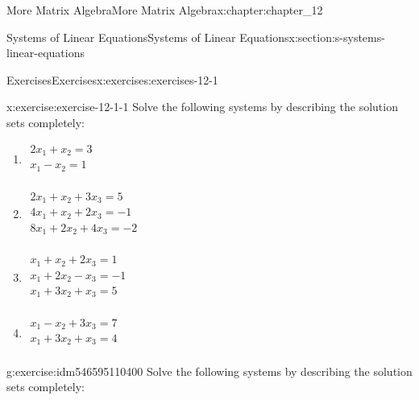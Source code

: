 \documentclass[oneside,10pt,]{book}
\numberwithin{equation}{section}
\begin{document}
\begin{chapterptx}{More Matrix Algebra}{}{More Matrix Algebra}{}{}{x:chapter:chapter_12}
\begin{sectionptx}{Systems of Linear Equations}{}{Systems of Linear Equations}{}{}{x:section:s-systems-linear-equations}
%
\begin{exercises-subsection}{Exercises}{}{Exercises}{}{}{x:exercises:exercises-12-1}
\begin{divisionexercise}{1}{}{}{x:exercise:exercise-12-1-1}%
Solve the following systems by describing the solution sets completely:%
\begin{multicols}{2}
\begin{enumerate}[label=(\alph*)]
\item{}\(\begin{array}{l}
2 x_1+x_2=3 \\
x_1-x_2=1 \\
\end{array}\)%
\item{}\(\begin{array}{l}
2 x_1+x_2+3 x_3=5 \\
4 x_1+x_2+2 x_3=-1 \\
8 x_1+2 x_2+4 x_3=-2 \\
\end{array}\)%
\item{}\(\begin{array}{l}
x_1+x_2+2 x_3=1 \\
x_1+2 x_2-x_3=-1 \\
x_1+3 x_2+x_3=5 \\
\end{array}\)%
\item{}\(\begin{array}{l}
x_1-x_2+3 x_3=7 \\
x_1+3 x_2+x_3=4 \\
\end{array}\)%
\end{enumerate}
\end{multicols}
%
\end{divisionexercise}%
\begin{divisionexercise}{2}{}{}{g:exercise:idm546595110400}%
Solve the following systems by describing the solution sets completely:%
\begin{multicols}{2}
\end{multicols}
\end{divisionexercise}
\end{exercises-subsection}
\end{sectionptx}
\end{chapterptx}
\end{document}
